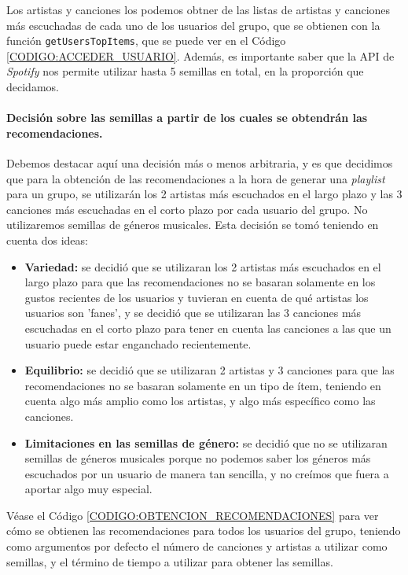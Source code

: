Los artistas y canciones los podemos obtner de las listas de artistas y canciones más escuchadas
de cada uno de los usuarios del grupo, que se obtienen con la función \texttt{getUsersTopItems}, que se puede ver en el Código \ref{CODIGO:ACCEDER_USUARIO}.
Además, es importante saber que la API de \textit{Spotify} nos permite utilizar hasta 5 semillas en total, en la proporción que decidamos.

\paragraph{Decisión sobre las semillas a partir de los cuales se obtendrán las recomendaciones.}

Debemos destacar aquí una decisión más o menos arbitraria, y es que decidimos que para la obtención de las recomendaciones a la hora de generar
una \textit{playlist} para un grupo, se utilizarán los 2 artistas más escuchados en el largo plazo y las 3 canciones más escuchadas en el corto plazo
por cada usuario del grupo. No utilizaremos semillas de géneros musicales. Esta decisión se tomó teniendo en cuenta dos ideas:

\begin{itemize}
  \item \textbf{Variedad:} se decidió que se utilizaran los 2 artistas más escuchados en el largo plazo para que las recomendaciones no se basaran
  solamente en los gustos recientes de los usuarios y tuvieran en cuenta de qué artistas los usuarios son 'fanes', y se decidió que se utilizaran 
  las 3 canciones más escuchadas en el corto plazo para tener en cuenta las canciones a las que un usuario puede estar enganchado recientemente.
  \item \textbf{Equilibrio:} se decidió que se utilizaran 2 artistas y 3 canciones para que las recomendaciones no se basaran solamente en un tipo
  de ítem, teniendo en cuenta algo más amplio como los artistas, y algo más específico como las canciones.
  \item \textbf{Limitaciones en las semillas de género:} se decidió que no se utilizaran semillas de géneros musicales porque no podemos saber los géneros más escuchados
  por un usuario de manera tan sencilla, y no creímos que fuera a aportar algo muy especial.
\end{itemize}

Véase el Código \ref{CODIGO:OBTENCION_RECOMENDACIONES} para ver cómo se obtienen las recomendaciones para todos los usuarios del grupo, 
teniendo como argumentos por defecto el número de canciones y artistas a utilizar como semillas, y el término de tiempo a utilizar para obtener las semillas.

